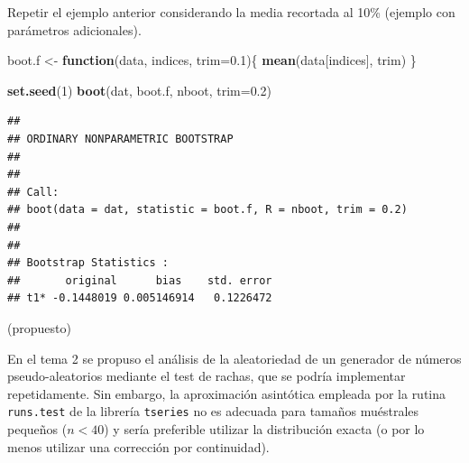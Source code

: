 \documentclass[]{book}
\newenvironment{Shaded}{\begin{snugshade}}{\end{snugshade}}
\newcommand{\KeywordTok}[1]{\textcolor[rgb]{0.13,0.29,0.53}{\textbf{#1}}}
\newcommand{\DataTypeTok}[1]{\textcolor[rgb]{0.13,0.29,0.53}{#1}}
\newcommand{\DecValTok}[1]{\textcolor[rgb]{0.00,0.00,0.81}{#1}}
\newcommand{\FloatTok}[1]{\textcolor[rgb]{0.00,0.00,0.81}{#1}}
\newcommand{\StringTok}[1]{\textcolor[rgb]{0.31,0.60,0.02}{#1}}
\newcommand{\ControlFlowTok}[1]{\textcolor[rgb]{0.13,0.29,0.53}{\textbf{#1}}}
\newcommand{\NormalTok}[1]{#1}
\theoremstyle{definition}
\theoremstyle{definition}
\theoremstyle{definition}
\theoremstyle{remark}
\let\BeginKnitrBlock\begin \let\EndKnitrBlock\end
\begin{document}
\BeginKnitrBlock{exercise}
\protect\hypertarget{exr:unnamed-chunk-71}{}{\label{exr:unnamed-chunk-71} }
\EndKnitrBlock{exercise}

Repetir el ejemplo anterior considerando la media recortada al 10\%
(ejemplo con parámetros adicionales).

\begin{Shaded}
\begin{Highlighting}[]
\NormalTok{boot.f <-}\StringTok{ }\ControlFlowTok{function}\NormalTok{(data, indices, }\DataTypeTok{trim=}\FloatTok{0.1}\NormalTok{)\{}
  \KeywordTok{mean}\NormalTok{(data[indices], trim)}
\NormalTok{\}}

\KeywordTok{set.seed}\NormalTok{(}\DecValTok{1}\NormalTok{)}
\KeywordTok{boot}\NormalTok{(dat, boot.f, nboot, }\DataTypeTok{trim=}\FloatTok{0.2}\NormalTok{)}
\end{Highlighting}
\end{Shaded}

\begin{verbatim}
## 
## ORDINARY NONPARAMETRIC BOOTSTRAP
## 
## 
## Call:
## boot(data = dat, statistic = boot.f, R = nboot, trim = 0.2)
## 
## 
## Bootstrap Statistics :
##       original      bias    std. error
## t1* -0.1448019 0.005146914   0.1226472
\end{verbatim}

 \vspace{0.5cm}

\BeginKnitrBlock{exercise}
\protect\hypertarget{exr:unnamed-chunk-73}{}{\label{exr:unnamed-chunk-73}
}(propuesto)
\EndKnitrBlock{exercise}

En el tema 2 se propuso el análisis de la aleatoriedad de un generador
de números pseudo-aleatorios mediante el test de rachas, que se podría
implementar repetidamente. Sin embargo, la aproximación asintótica
empleada por la rutina \texttt{runs.test} de la librería
\texttt{tseries} no es adecuada para tamaños muéstrales pequeños
(\(n<40\)) y sería preferible utilizar la distribución exacta (o por lo
menos utilizar una corrección por continuidad).
\end{document}
